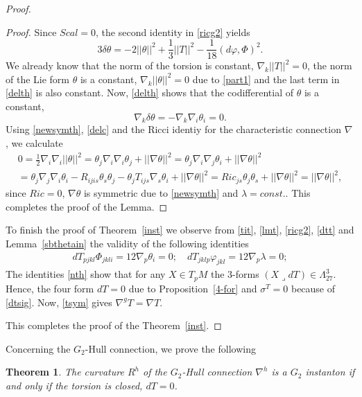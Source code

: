 \documentclass[10pt,british]{article}
\newtheorem{thrm}{Theorem}[section]
\def\sb {{\nabla}}
\def\LC{{\nabla^g}}
\def\p{{\varphi}}
\def\ph{{\Phi}}
\begin{document}
\begin{proof}
\begin{proof}
Since $Scal=0$, the second identity in \eqref{ricg2} yields
\begin{equation}\label{delth}
3\delta\theta=-2||\theta||^2+\frac13||T||^2-\frac1{18}(d\p,\ph)^2.
\end{equation}
We already know that the norm of the torsion is constant, $\sb_k||T||^2=0$,  the norm of the Lie form $\theta$ is a  constant, $\sb_k||\theta||^2=0$ due to \eqref{part1} and the last term in \eqref{delth} is also constant. %
 Now, \eqref{delth}  shows that the codifferential of $\theta$ is a constant, 
\begin{equation}\label{delc}
\sb_k\delta\theta=-\sb_k\sb_i\theta_i=0.
\end{equation}
Using \eqref{newsymth}, \eqref{delc}  and the Ricci identiy for the characteristic connection $\sb$, we calculate %
\begin{multline*}
0=\frac12\sb_i\sb_i||\theta||^2=\theta_j\sb_i\sb_i\theta_j+||\sb\theta||^2=\theta_j\sb_i\sb_j\theta_i+||\sb\theta||^2\\=\theta_j\sb_j\sb_i\theta_i
-R_{ijis}\theta_s\theta_j-\theta_jT_{ijs}\sb_s\theta_i+||\sb\theta||^2=Ric_{js}\theta_j\theta_s+||\sb\theta||^2=||\sb\theta||^2,
\end{multline*}
since $Ric=0$, $\sb\theta$ is symmetric due to \eqref{newsymth} and $\lambda=const.$. This completes the proof of the Lemma.
\end{proof}
To finish the proof of Theorem~\ref{inst} we observe  from  \eqref{tit}, \eqref{lmt},  \eqref{ricg2},  \eqref{dtt}  
 and Lemma~\ref{sbthetain} the validity of the following  identities
\begin{equation}\label{nth}
\begin{split}
dT_{pjkl}\Phi_{jkli}=12\sb_p\theta_i=0;\quad
dT_{jklp}\p_{jkl}=12\sb_p\lambda=0;
\end{split}
\end{equation}
The identities \eqref{nth} show that for any $X\in T_pM$ the 3-forms  $(X\lrcorner dT)\in \Lambda^3_{27}$. Hence, the four form $dT=0$ due to Proposition~\ref{4-for} and $\sigma^T=0$ because of \eqref{dtsig}. Now, \eqref{tsym} gives $\LC T=\sb T$. 

This  completes the proof of the Theorem~\ref{inst}.
\end{proof}
Concerning the $G_2$-Hull connection, we prove the following
\begin{thrm}\label{hul}
The curvature $R^h$ of the $G_2$-Hull connection $\sb^h$ is a $G_2$ instanton if and only if the torsion is closed, $dT=0$.
\end{thrm}
\end{document}
